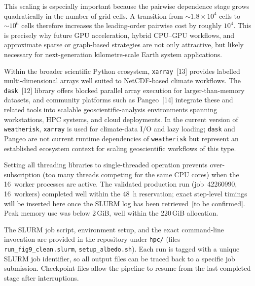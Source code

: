 \documentclass[preprint,12pt,a4paper]{elsarticle}
\newcommand{\revg}[1]{{\color{RevisionGreen}#1}}
\newcommand{\revo}[1]{{\color{RevisionOrange}#1}}
\begin{document}
{\revg{This scaling is especially important because the pairwise
dependence stage grows quadratically in the number of grid cells. A
transition from $\sim 1.8 \times 10^4$ cells to $\sim 10^6$ cells
therefore increases the leading-order pairwise cost by roughly
$10^4$. This is precisely why future GPU acceleration, hybrid CPU--GPU
workflows, and approximate sparse or graph-based strategies are not
only attractive, but likely necessary for next-generation
kilometre-scale Earth system applications.}

\revo{Within the broader scientific Python ecosystem, \texttt{xarray}~[13]
provides labelled multi-dimensional arrays well suited to NetCDF-based
climate workflows. The \texttt{dask}~[12] library offers blocked
parallel array execution for larger-than-memory datasets, and
community platforms such as Pangeo~[14] integrate these and related
tools into scalable geoscientific-analysis environments spanning
workstations, HPC systems, and cloud deployments. In the current
version of \texttt{weatherisk}, \texttt{xarray} is used for
climate-data I/O and lazy loading; \texttt{dask} and Pangeo are not
current runtime dependencies of \texttt{weatherisk} but represent an
established ecosystem context for scaling geoscientific workflows of
this type.}

\noindent Setting all threading libraries to single-threaded
operation prevents over-subscription\revo{ (too many threads competing for
the same CPU cores)} when the 16~worker processes are active.
The validated production run (job~42260990, 16~workers) completed
well within the 48~h reservation; exact step-level timings will be
inserted here once the SLURM log has been retrieved~[to be confirmed].
Peak memory use was below 2\,GiB, well within the 220\,GiB
allocation.

The SLURM job script, environment setup, and the exact command-line
invocation are provided in the repository under \texttt{hpc/}
(files \texttt{run\_fig9\_clean.slurm}, \texttt{setup\_albedo.sh}).
\revo{Each run is tagged with a unique SLURM job identifier, so all output
files can be traced back to a specific job submission.} Checkpoint files
allow the pipeline to resume from the last completed stage after
interruptions.}
\end{document}
